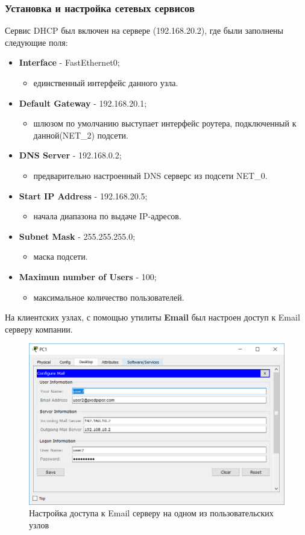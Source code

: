 \subsubsection{Установка и настройка сетевых сервисов}
Сервис DHCP был включен на сервере (192.168.20.2), где были заполнены следующие поля:
\begin{itemize}
\item \textbf{Interface} - FastEthernet0;
\begin{itemize}
\item единственный интерфейс данного узла.
\end{itemize}
\item \textbf{Default Gateway} - 192.168.20.1;
\begin{itemize}
\item шлюзом по умолчанию выступает интерфейс роутера, подключенный к данной(NET\_2) подсети.
\end{itemize}
\item \textbf{DNS Server} - 192.168.0.2;
\begin{itemize}
\item предварительно настроенный DNS серверс из подсети NET\_0.
\end{itemize}
\item \textbf{Start IP Address} - 192.168.20.5;
\begin{itemize}
\item начала диапазона по выдаче IP-адресов.
\end{itemize}
\item \textbf{Subnet Mask} - 255.255.255.0;
\begin{itemize}
\item маска подсети.
\end{itemize}
\item \textbf{Maximun number of Users} - 100;
\begin{itemize}
\item максимальное количество пользователей.
\end{itemize}
\end{itemize}
На клиентских узлах, с помощью утилиты \textbf{Email} был настроен доступ к Email серверу компании.
\begin{figure}[H]
  \centering
  \includegraphics[width=.8\textwidth]{img/net2_pc1__0}
  \caption{Настройка доступа к Email серверу на одном из пользовательских узлов}
\end{figure}

